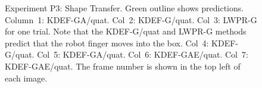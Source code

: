 \begin{figure}[tbp]
\caption {Experiment P3: Shape Transfer. Green outline shows predictions. Column~1: KDEF-GA/quat.
  Col~2: KDEF-G/quat. Col~3: LWPR-G for one trial.  Note that the
  KDEF-G/quat and LWPR-G methods predict that the robot finger moves
  into the box.  Col~4: KDEF-G/quat. Col~5: KDEF-GA/quat. Col~6:
  KDEF-GAE/quat. Col~7: KDEF-GAE/quat. The frame number is shown in
  the top left of each image.  }
\label{fig:ExperimentStransfer}
\end{figure}


